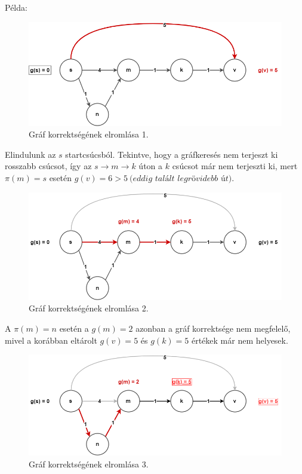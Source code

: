 \documentclass[12pt,margin=0px]{article}
\begin{document}
    {\footnotesize
    \noindent Példa:\\

	\begin{figure}[H]
		\centering
		\includegraphics[width=0.8\linewidth]{img/incorrect_g1}
		\caption{Gráf korrektségének elromlása 1.}
		\label{fig:incorrect_gone}
	\end{figure}

    \noindent Elindulunk az $s$ startcsúcsból. Tekintve, hogy a gráfkeresés nem terjeszt ki rosszabb csúcsot, így az $s \rightarrow m \rightarrow k$ úton a $k$ csúcsot már nem terjeszti ki, mert $\pi(m)=s$ esetén $g(v) = 6 > 5 \ \textit{(eddig talált legrövidebb út)}$.\\

	\begin{figure}[H]
		\centering
        \includegraphics[width=0.8\linewidth]{img/incorrect_g2}
		\caption{Gráf korrektségének elromlása 2.}
		\label{fig:incorrect_gtwo}
	\end{figure}

    \noindent A $\pi(m) = n$ esetén a $g(m)=2$ azonban a gráf korrektsége nem megfelelő, mivel a korábban eltárolt $g(v)=5$ és $g(k)=5$ értékek már nem helyesek.

	\begin{figure}[H]
		\centering
        \includegraphics[width=0.8\linewidth]{img/incorrect_g3}
		\caption{Gráf korrektségének elromlása 3.}
		\label{fig:incorrect_gthree}
	\end{figure}

}
\end{document}
